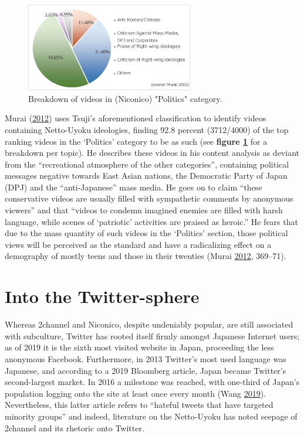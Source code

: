 \documentclass[10pt,british,A4paper,,openany]{memoir}
\begin{document}
\begin{figure}[!htb]
 \centering
  \caption{\label{fig:murai-ratio} Breakdown of videos in (Niconico) "Politics" category.}
 \includegraphics[width=0.65\textwidth,trim=4 4 4 4,clip]{images/murai-ratio2.eps}
\end{figure}

Murai (\protect\hyperlink{ref-murai_net_2012}{2012}) uses Tsuji's
aforementioned classification to identify videos containing Netto-Uyoku
ideologies, finding 92.8 percent (3712/4000) of the top ranking videos
in the `Politics' category to be as such (see \textbf{figure
\ref{fig:murai-ratio}} for a breakdown per topic). He describes these
videos in his content analysis as deviant from the ``recreational
atmosphere of the other categories'', containing political messages
negative towards East Asian nations, the Democratic Party of Japan (DPJ)
and the ``anti-Japanese'' mass media. He goes on to claim ``these
conservative videos are usually filled with sympathetic comments by
anonymous viewers'' and that ``videos to condemn imagined enemies are
filled with harsh language, while scenes of `patriotic' activities are
praised as heroic.'' He fears that due to the mass quantity of such
videos in the `Politics' section, those political views will be
perceived as the standard and have a radicalizing effect on a demography
of mostly teens and those in their twenties (Murai
\protect\hyperlink{ref-murai_net_2012}{2012}, 369--71).

\section{Into the Twitter-sphere}\label{into-the-twitter-sphere}

Whereas 2channel and Niconico, despite undeniably popular, are still
associated with subculture, Twitter has rooted itself firmly amongst
Japanese Internet users; as of 2019 it is the sixth most visited website
in Japan, proceeding the less anonymous Facebook. Furthermore, in 2013
Twitter's most used language was Japanese, and according to a 2019
Bloomberg article, Japan became Twitter's second-largest market. In 2016
a milestone was reached, with one-third of Japan's population logging
onto the site at least once every month (Wang
\protect\hyperlink{ref-wang_how_2019}{2019}). Nevertheless, this latter
article refers to ``hateful tweets that have targeted minority groups''
and indeed, literature on the Netto-Uyoku has noted seepage of 2channel
and its rhetoric onto Twitter.
\end{document}
